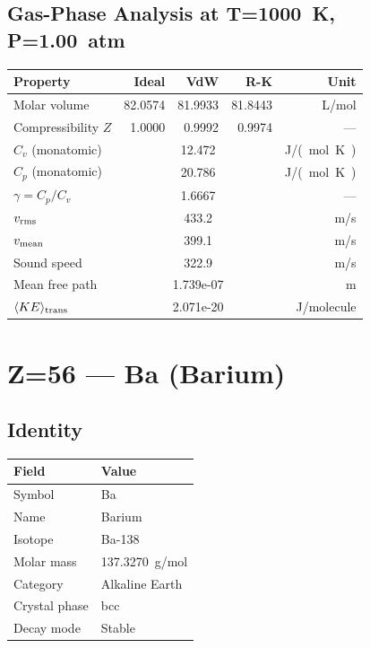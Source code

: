 \documentclass[11pt,a4paper]{article}
\begin{document}
\subsection{Gas-Phase Analysis at T=\SI{1000}{K}, P=\SI{1.00}{atm}}
\begin{tabular}{lrrrr}
  \toprule
  Property & Ideal & VdW & R-K & Unit \\
  \midrule
  Molar volume & 82.0574 & 81.9933 & 81.8443 & \si{L/mol} \\
  Compressibility $Z$ & 1.0000 & 0.9992 & 0.9974 & --- \\
  \midrule
  $C_v$ (monatomic) & \multicolumn{3}{c}{12.472} & \si{J/(mol.K)} \\
  $C_p$ (monatomic) & \multicolumn{3}{c}{20.786} & \si{J/(mol.K)} \\
  $\gamma = C_p/C_v$ & \multicolumn{3}{c}{1.6667} & --- \\
  $v_{\rm rms}$ & \multicolumn{3}{c}{433.2} & \si{m/s} \\
  $v_{\rm mean}$ & \multicolumn{3}{c}{399.1} & \si{m/s} \\
  Sound speed & \multicolumn{3}{c}{322.9} & \si{m/s} \\
  Mean free path & \multicolumn{3}{c}{1.739e-07} & \si{m} \\
  $\langle KE \rangle_{\rm trans}$ & \multicolumn{3}{c}{2.071e-20} & \si{J/molecule} \\
  \bottomrule
\end{tabular}

\newpage

\section{Z=56 --- Ba (Barium)}
\label{sec:Z56}

\subsection{Identity}
\begin{tabular}{ll}
  \toprule
  Field & Value \\
  \midrule
  Symbol & Ba \\
  Name & Barium \\
  Isotope & Ba-138 \\
  Molar mass & \SI{137.3270}{g/mol} \\
  Category & Alkaline Earth \\
  Crystal phase & bcc \\
  Decay mode & Stable \\
  \bottomrule
\end{tabular}
\end{document}
